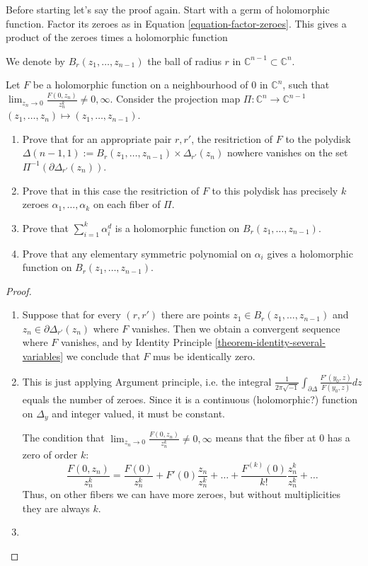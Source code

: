 Before starting let's say the proof again.
Start with a germ of holomorphic function.
Factor its zeroes as in Equation \ref{equation-factor-zeroes}.
This gives a product of the zeroes times a holomorphic function

We denote by $B_r(z_1,\ldots,z_{n-1})$ the ball of radius $r$ in
$\mathbb{C}^{n-1}\subset\mathbb{C}^n$.

\begin{exercise}
\label{exercise-polydisks}
Let $F$ be a holomorphic function on a neighbourhood of $0$ in $\mathbb{C}^n$,
such that $\lim_{z_n\to 0} \frac{F(0,z_n)}{z_n^k}\neq 0,\infty$.
Consider the projection map $\Pi:\mathbb{C}^n\to\mathbb{C}^{n-1}$ 
$(z_1,\ldots,z_n)\mapsto (z_1,\ldots,z_{n-1})$.
\begin{enumerate}
\item Prove that for an appropriate pair $r,r'$, the resitriction of $F$ to the
polydisk $\Delta(n-1,1):=B_r(z_1,\ldots,z_{n-1})\times\Delta_{r'}(z_n)$ nowhere
vanishes on the set $\Pi^{-1}(\partial\Delta_{r'}(z_n))$.
\item Prove that in this case the resitriction of $F$ to this polydisk has
precisely $k$ zeroes $\alpha_1,\ldots,\alpha_k$ on each fiber of $\Pi$.
\item Prove that $\sum_{i=1}^k \alpha_i^d$ is a holomorphic function on
$B_r(z_1,\ldots,z_{n-1})$.
\item Prove that any elementary symmetric polynomial on $\alpha_i$ gives a
holomorphic function on $B_r(z_1,\ldots,z_{n-1})$.
\end{enumerate}
\end{exercise}

\begin{proof}
\begin{enumerate}
\item Suppose that for every $(r,r')$ there are points 
$z_1\in B_r(z_1,\ldots,z_{n-1})$ and $z_n\in \partial\Delta_{r'}(z_n)$
where $F$ vanishes. Then we obtain a convergent sequence where $F$
vanishes, and by Identity Principle \ref{theorem-identity-several-variables} we
conclude that $F$ mus be identically zero.
\item This is just applying Argument principle, i.e. the integral 
$\frac{1}{2\pi\sqrt{-1}}\int_{\partial \Delta}\frac{F'(y_0,z)}{F(y_0,z)}dz$ 
equals the number of zeroes. Since it is a continuous (holomorphic?) function on
$\Delta_y$ and integer valued, it must be constant.

The condition that $\lim_{z_n\to0}\frac{F(0,z_n)}{z_n^k}\neq 0,\infty$ means
that the fiber at 0 has a zero of order $k$:
$$
\frac{F(0,z_n)}{z_n^k}=\frac{F(0)}{z_n^k}+F'(0)\frac{z_n}{z_n^k}+\ldots
+\frac{F^{(k)}(0)}{k!}\frac{z_n^k}{z_n^k}+\ldots
$$
Thus, on other fibers we can have
more zeroes, but without multiplicities they are always $k$.
\item 
\end{enumerate}
\end{proof}

